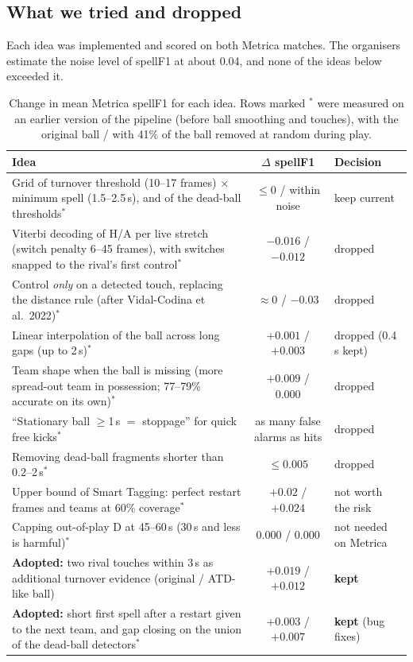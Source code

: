 \documentclass[11pt,a4paper]{article}
\begin{document}
\subsection{What we tried and dropped}
\label{sec:rejected}
Each idea was implemented and scored on both Metrica matches. The organisers estimate the noise level of spellF1 at
about 0.04, and none of the ideas below exceeded it.

\begin{table}[ht]
\centering
\small
\caption{Change in mean Metrica spellF1 for each idea. Rows marked $^*$ were measured on an earlier version of the
pipeline (before ball smoothing and touches), with the original ball / with 41\% of the ball removed at random during
play.}
\label{tab:rejected}
{\renewcommand{\arraystretch}{1.3}
\begin{tabularx}{\textwidth}{|X|c|l|}
\hline
\textbf{Idea} & \textbf{$\Delta$ spellF1} & \textbf{Decision} \\
\hline
Grid of turnover threshold (10--17 frames) $\times$ minimum spell (1.5--2.5\,s), and of the dead-ball thresholds$^*$ &
  $\le 0$ / within noise & keep current \\
\hline
Viterbi decoding of H/A per live stretch (switch penalty 6--45 frames), with switches snapped to the rival's first
  control$^*$ & $-0.016$ / $-0.012$ & dropped \\
\hline
Control \emph{only} on a detected touch, replacing the distance rule (after Vidal-Codina et al.\ 2022)$^*$ &
  $\approx 0$ / $-0.03$ & dropped \\
\hline
Linear interpolation of the ball across long gaps (up to 2\,s)$^*$ & $+0.001$ / $+0.003$ & dropped (0.4\,s kept) \\
\hline
Team shape when the ball is missing (more spread-out team in possession; 77--79\% accurate on its own)$^*$ &
  $+0.009$ / $0.000$ & dropped \\
\hline
``Stationary ball $\ge$1\,s $=$ stoppage'' for quick free kicks$^*$ & as many false alarms as hits & dropped \\
\hline
Removing dead-ball fragments shorter than 0.2--2\,s$^*$ & $\le 0.005$ & dropped \\
\hline
Upper bound of Smart Tagging: perfect restart frames and teams at 60\% coverage$^*$ & $+0.02$ / $+0.024$ & not worth
  the risk \\
\hline
Capping out-of-play D at 45--60\,s (30\,s and less is harmful)$^*$ & $0.000$ / $0.000$ & not needed on Metrica \\
\hline
\textbf{Adopted:} two rival touches within 3\,s as additional turnover evidence (original / ATD-like ball) &
  $+0.019$ / $+0.012$ & \textbf{kept} \\
\hline
\textbf{Adopted:} short first spell after a restart given to the next team, and gap closing on the union of the
  dead-ball detectors$^*$ & $+0.003$ / $+0.007$ & \textbf{kept} (bug fixes) \\
\hline
\end{tabularx}}
\end{table}
\end{document}
